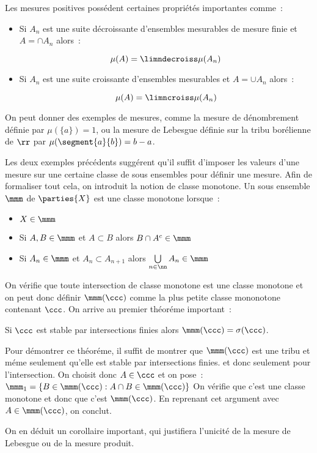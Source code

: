 Les mesures positives possédent certaines propriétés importantes comme~:\par
\begin{itemize}
\item{} Si $A_n$ est une suite décroissante d'ensembles mesurables de mesure finie et $A = \cap A_n$ alors~:\par
$$\mu(A) = \limndecroiss \mu(A_n)$$
\item{} Si $A_n$ est une suite croissante d'ensembles mesurables et $A = \cup A_n$ alors~:\par
$$\mu(A) = \limncroiss \mu(A_n)$$
\end{itemize}
On peut donner des exemples de mesures, comme la mesure de dénombrement définie par $\mu(\lbrace{a\rbrace}) = 1$, ou la mesure de 
Lebesgue définie sur la tribu borélienne de $\rr$ par $\mu(\segment{a}{b}) = b-a$.\par
Les deux exemples précédents suggérent qu'il suffit d'imposer les valeurs d'une mesure sur une certaine classe
de sous ensembles pour définir une mesure. Afin de formaliser tout cela, on introduit la notion de classe monotone.
 Un sous ensemble $\mmm$ de $\parties{X}$ est une classe monotone lorsque~:
\begin{itemize}
\item{} $X\in \mmm$
\item{} Si $A,B\in \mmm$ et $A\subset B$ alors $B\cap A^c\in \mmm$
\item{} Si $A_n\in \mmm$ et $A_n\subset A_{n+1}$ alors $\bigcup\limits_{n\in \nn} A_n \in \mmm$
\end{itemize}
On vérifie que toute intersection de classe monotone est une classe monotone et on peut donc définir $\mmm(\ccc)$ 
comme la plus petite classe mononotone contenant $\ccc$. On arrive au premier théoréme important~:\par
{} Si $\ccc$ est stable par intersections finies alors $\mmm(\ccc) = \sigma(\ccc)$.\par
Pour démontrer ce théoréme, il suffit de montrer que $\mmm(\ccc)$ est une tribu et méme seulement qu'elle est stable par 
intersections finies. et donc seulement pour l'intersection. On choisit donc $A \in \ccc$ et on pose~:
$\mmm_1 = \lbrace B\in \mmm(\ccc) : A\cap B\in \mmm(\ccc)\rbrace$ On vérifie que c'est une classe monotone et donc que c'est 
$\mmm(\ccc)$. En reprenant cet argument avec $A\in \mmm(\ccc)$, on conclut.\par
On en déduit un corollaire important, qui justifiera l'unicité de la mesure de Lebesgue ou de la mesure produit.
